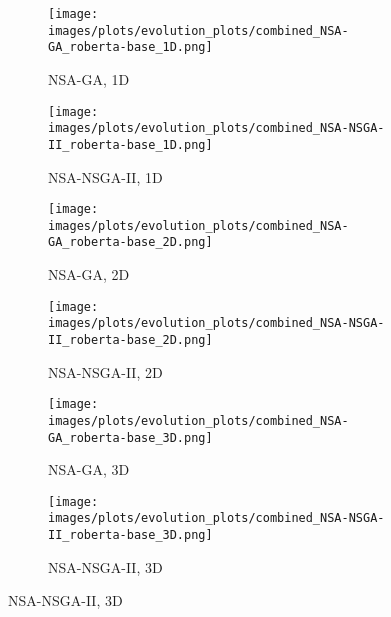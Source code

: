 
        \begin{figure}[htbp]
        \centering    \begin{subfigure}[b]{0.40\textwidth}
        \texttt{[image: images/plots/evolution\_plots/combined\_NSA-GA\_roberta-base\_1D.png]}
        \caption{\scriptsize NSA-GA, 1D}
        \label{subfig:roberta-base_NSA-GA_1D}
        \end{subfigure}\hspace{0.05\textwidth}
    \begin{subfigure}[b]{0.40\textwidth}
        \texttt{[image: images/plots/evolution\_plots/combined\_NSA-NSGA-II\_roberta-base\_1D.png]}
        \caption{\scriptsize NSA-NSGA-II, 1D}
        \label{subfig:roberta-base_NSA-NSGA-II_1D}
        \end{subfigure}

    \vspace{0.2cm}
    \begin{subfigure}[b]{0.40\textwidth}
        \texttt{[image: images/plots/evolution\_plots/combined\_NSA-GA\_roberta-base\_2D.png]}
        \caption{\scriptsize NSA-GA, 2D}
        \label{subfig:roberta-base_NSA-GA_2D}
        \end{subfigure}\hspace{0.05\textwidth}
    \begin{subfigure}[b]{0.40\textwidth}
        \texttt{[image: images/plots/evolution\_plots/combined\_NSA-NSGA-II\_roberta-base\_2D.png]}
        \caption{\scriptsize NSA-NSGA-II, 2D}
        \label{subfig:roberta-base_NSA-NSGA-II_2D}
        \end{subfigure}

    \vspace{0.2cm}
    \begin{subfigure}[b]{0.40\textwidth}
        \texttt{[image: images/plots/evolution\_plots/combined\_NSA-GA\_roberta-base\_3D.png]}
        \caption{\scriptsize NSA-GA, 3D}
        \label{subfig:roberta-base_NSA-GA_3D}
        \end{subfigure}\hspace{0.05\textwidth}
    \begin{subfigure}[b]{0.40\textwidth}
        \texttt{[image: images/plots/evolution\_plots/combined\_NSA-NSGA-II\_roberta-base\_3D.png]}
        \caption{\scriptsize NSA-NSGA-II, 3D}
        \label{subfig:roberta-base_NSA-NSGA-II_3D}
        \end{subfigure}


\end{figure}
